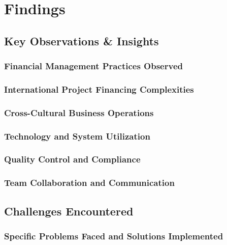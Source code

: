 
\chapter{Findings}

\section{Key Observations \& Insights}

\subsection{Financial Management Practices Observed}

\subsection{International Project Financing Complexities}

\subsection{Cross-Cultural Business Operations}

\subsection{Technology and System Utilization}

\subsection{Quality Control and Compliance}

\subsection{Team Collaboration and Communication}

\section{Challenges Encountered}

\subsection{Specific Problems Faced and Solutions Implemented}

